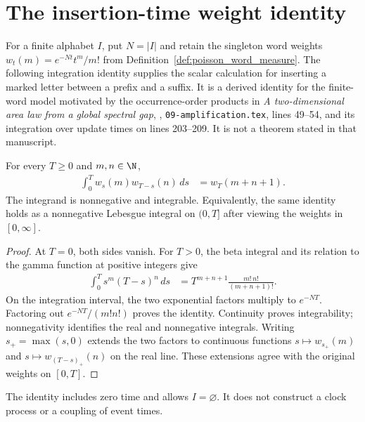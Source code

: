 \section{The insertion-time weight identity}
\label{sec:poisson_word_insertion_weight}

For a finite alphabet $I$, put $N=|I|$ and retain the singleton word
weights $w_t(m)=e^{-Nt}t^m/m!$ from
Definition~\ref{def:poisson_word_measure}.  The following integration
identity supplies the scalar calculation for inserting a marked letter
between a prefix and a suffix.  It is a derived identity for the finite-word
model motivated by the occurrence-order products in
\emph{A two-dimensional area law from a global spectral gap},
\cite{OpenAI2026AreaLaw}, \texttt{09-amplification.tex}, lines 49--54,
and its integration over update times on lines 203--209.  It is not a
theorem stated in that manuscript.

\begin{lemma}
\label{lem:poisson_word_insertion_weight}
\leanok
{}
For every $T\geq0$ and $m,n\in\N$,
\begin{align}
 \int_0^T w_s(m)w_{T-s}(n)\,ds
 &=w_T(m+n+1).
 \label{eq:poisson_word_insertion_weight}
\end{align}
The integrand is nonnegative and integrable.  Equivalently, the same
identity holds as a nonnegative Lebesgue integral on $(0,T]$ after viewing
the weights in $[0,\infty]$.
\end{lemma}
\begin{proof}
\leanok
At $T=0$, both sides vanish.  For $T>0$, the beta integral and its relation
to the gamma function at positive integers give
\begin{align}
 \int_0^T s^m(T-s)^n\,ds
 &=T^{m+n+1}\frac{m!\,n!}{(m+n+1)!}.
 \label{eq:poisson_word_insertion_beta}
\end{align}
On the integration interval, the two exponential factors multiply to
$e^{-NT}$.  Factoring out $e^{-NT}/(m!n!)$ proves the identity.
Continuity proves integrability; nonnegativity identifies the real and
nonnegative integrals.  Writing $s_+=\max(s,0)$ extends the two factors
to continuous functions $s\mapsto w_{s_+}(m)$ and
$s\mapsto w_{(T-s)_+}(n)$ on the real line.  These extensions agree with
the original weights on $[0,T]$.
\end{proof}

The identity includes zero time and allows $I=\varnothing$.  It does not
construct a clock process or a coupling of event times.
